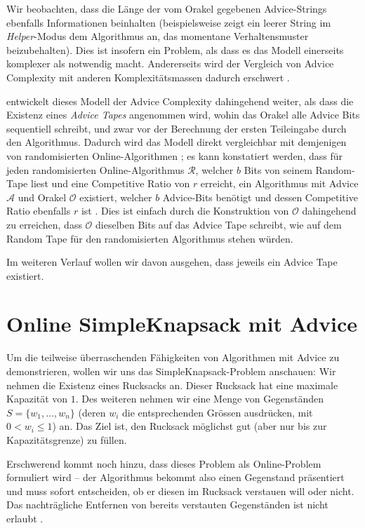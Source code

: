 \documentclass[11pt,abstracton]{scrreprt} %
\theoremstyle{definition}
\begin{document}
\bigskip

Wir beobachten, dass die Länge der vom Orakel gegebenen Advice-Strings ebenfalls Informationen beinhalten (beispielsweise zeigt ein leerer String im {\sl Helper}-Modus dem Algorithmus an, das momentane Verhaltensmuster beizubehalten). Dies ist insofern ein Problem, als dass es das Modell einerseits komplexer als notwendig macht. Andererseits wird der Vergleich von Advice Complexity mit anderen Komplexitätsmassen dadurch erschwert \cite{BKK}.

\cite{BKKR} entwickelt dieses Modell der Advice Complexity dahingehend weiter, als dass die Existenz eines {\sl Advice Tapes} angenommen wird, wohin das Orakel alle Advice Bits sequentiell schreibt, und zwar vor der Berechnung der ersten Teileingabe durch den Algorithmus. Dadurch wird das Modell direkt vergleichbar mit demjenigen von randomisierten Online-Algorithmen \cite{BKK}; es kann konstatiert werden, dass für jeden randomisierten Online-Algorithmus $\mathcal{R}$, welcher $b$ Bits von seinem Random-Tape liest und eine Competitive Ratio von $r$ erreicht, ein Algorithmus mit Advice $\mathcal{A}$ und Orakel $\mathcal{O}$ existiert, welcher $b$ Advice-Bits benötigt und dessen Competitive Ratio ebenfalls $r$ ist \cite{BKKR}. Dies ist einfach durch die Konstruktion von $\mathcal{O}$ dahingehend zu erreichen, dass $\mathcal{O}$ dieselben Bits auf das Advice Tape schreibt, wie auf dem Random Tape für den randomisierten Algorithmus stehen würden.

\bigskip
Im weiteren Verlauf wollen wir davon ausgehen, dass jeweils ein Advice Tape existiert.

\section{Online {\sc SimpleKnapsack} mit Advice}

Um die teilweise überraschenden Fähigkeiten von Algorithmen mit Advice zu demonstrieren, wollen wir uns das {\sc SimpleKnapsack}-Problem anschauen: Wir nehmen die Existenz eines Rucksacks an. Dieser Rucksack hat eine maximale Kapazität von $1$. Des weiteren nehmen wir eine Menge von Gegenständen $S = \{ w_1, \dots, w_n \}$ (deren $w_i$ die entsprechenden Grössen ausdrücken, mit $0 < w_i \le 1$) an. Das Ziel ist, den Rucksack möglichst gut (aber nur bis zur Kapazitätsgrenze) zu füllen.

Erschwerend kommt noch hinzu, dass dieses Problem als Online-Problem formuliert wird -- der Algorithmus bekommt also einen Gegenstand präsentiert und muss sofort entscheiden, ob er diesen im Rucksack verstauen will oder nicht. Das nachträgliche Entfernen von bereits verstauten Gegenständen ist nicht erlaubt \cite{knapsack}.
\end{document}
